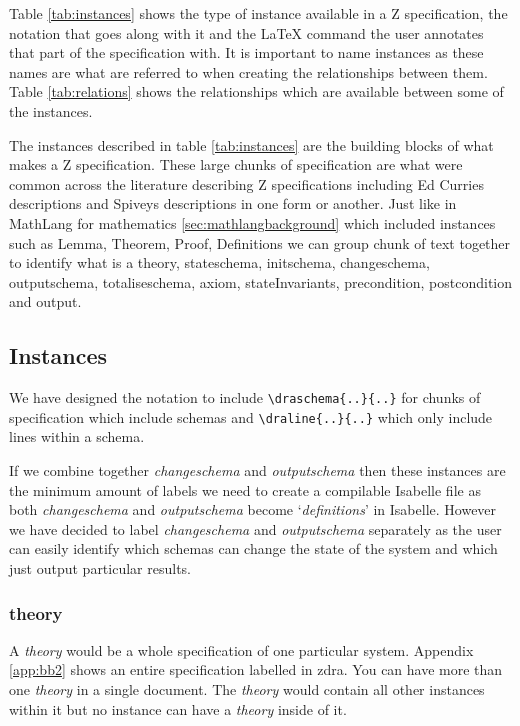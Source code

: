 Table \ref{tab:instances} shows the type of instance available in a Z
specification, the notation that goes along with it and the \LaTeX{} command the
user annotates that part of the specification with. It is important to name
instances as these names are what are referred to when creating the
relationships between them. Table \ref{tab:relations} shows the relationships
which are available between some of the instances. 

The instances described in table \ref{tab:instances} are the building blocks of
what makes a Z specification. These large chunks of specification are what were
common across the literature describing Z specifications including Ed Curries descriptions \cite{essenceofz} and Spiveys descriptions
\cite{spiveyreferencemanual} in one form or another. Just like in MathLang for
mathematics \ref{sec:mathlangbackground} which included instances such as Lemma,
Theorem, Proof, Definitions we can group chunk of text together to identify what
is a theory, stateschema, initschema, changeschema, outputschema,
totaliseschema, axiom, stateInvariants, precondition, postcondition and output.

\subsection{Instances}

We have designed the notation to include \verb|\draschema{..}{..}| for chunks of
specification which include schemas and \verb|\draline{..}{..}| which only
include lines within a schema.

If we combine together \emph{changeschema} and \emph{outputschema} then these
instances are the minimum amount of labels we need to create a compilable
Isabelle file as both \emph{changeschema} and \emph{outputschema} become
`\emph{definitions}' in Isabelle. However we have decided to label
\emph{changeschema} and \emph{outputschema} separately as the user can easily
identify which schemas can change the state of the system and which just output
particular results.

\subsubsection{theory}

A \emph{theory} would be a whole specification of one particular system.
Appendix \ref{app:bb2} shows an entire specification labelled in \gls{zdra}. You can have
more than one \emph{theory} in a single document. The \emph{theory} would
contain all other instances within it but no instance can have a \emph{theory}
inside of it.

